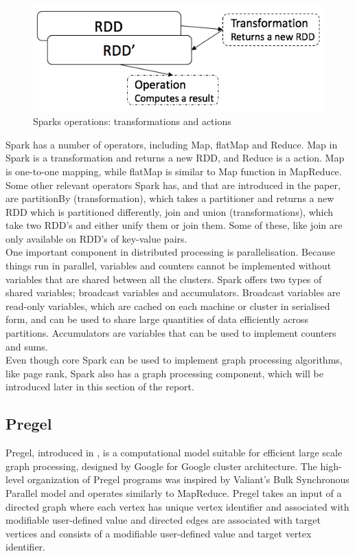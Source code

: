\documentclass{article}
\theoremstyle{definition}
\begin{document}
\begin{figure}[H]
\centering
\includegraphics[scale=0.5]{RDD}
\caption{Sparks operations: transformations and actions}
\end{figure}

Spark has a number of operators, including Map, flatMap and Reduce. Map in Spark is a transformation and returns a new RDD, and Reduce is a action. Map is one-to-one mapping, while flatMap is similar to Map function in MapReduce. Some other relevant operators Spark has, and that are introduced in the paper, are partitionBy (transformation), which takes a partitioner and returns a new RDD which is partitioned differently, join and union (transformations), which take two RDD's and either unify them or join them. Some of these, like join are only available on RDD's of key-value pairs. \\

One important component in distributed processing is parallelisation. Because things run in parallel, variables and counters cannot be implemented without variables that are shared between all the clusters. Spark offers two types of shared variables; broadcast variables and accumulators. Broadcast variables are read-only variables, which are cached on each machine or cluster in serialised form, and can be used to share large quantities of data efficiently across partitions. Accumulators are variables that can be used to implement counters and sums.  \\ 

Even though core Spark can be used to implement graph processing algorithms, like page rank, Spark also has a graph processing component, which will be introduced later in this section of the report. 

\subsection{Pregel}
Pregel, introduced in \cite{Malewicz2010}, is a computational model suitable for efficient large scale graph processing, designed by Google for Google cluster architecture. The high-level organization of Pregel programs was inspired by Valiant's Bulk Synchronous Parallel model \cite{Valiant} and operates similarly to MapReduce. Pregel takes an input of a directed graph where each vertex has unique vertex identifier and associated with modifiable user-defined value and directed edges are associated with target vertices and consists of a modifiable user-defined value and target vertex identifier.
\end{document}
